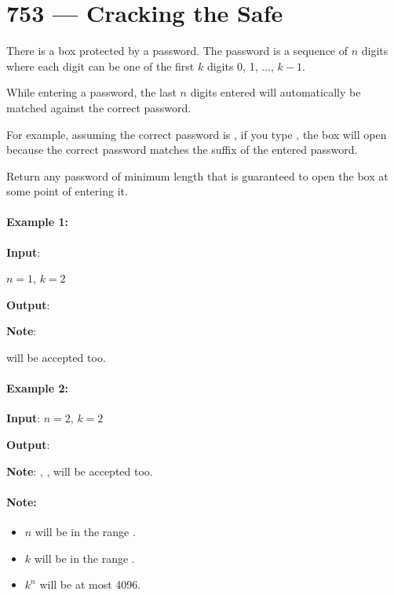 \section{753 --- Cracking the Safe}
There is a box protected by a password. The password is a sequence of $n$ digits where each digit can be one of the first $k$ digits 0, 1, $\ldots$, $k-1$.

While entering a password, the last $n$ digits entered will automatically be matched against the correct password.

For example, assuming the correct password is , if you type , the box will open because the correct password matches the suffix of the entered password.

Return any password of minimum length that is guaranteed to open the box at some point of entering it.
 

\paragraph{Example 1:}

\begin{flushleft}
\textbf{Input}: 

$n = 1$, $k = 2$

\textbf{Output}: 


\textbf{Note}: 

 will be accepted too.
\end{flushleft}

\paragraph{Example 2:}

\begin{flushleft}
\textbf{Input}: $n = 2$, $k = 2$

\textbf{Output}: 

\textbf{Note}: , ,  will be accepted too.

\end{flushleft}
 

\paragraph{Note:}

\begin{itemize}
\item $n$ will be in the range \fcj{[1, 4]}.
\item $k$ will be in the range \fcj{[1, 10]}.
\item $k^n$ will be at most 4096.
\end{itemize}

